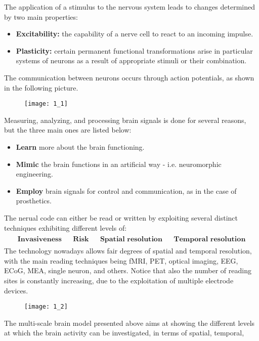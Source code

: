 The application of a stimulus to the nervous system leads to changes determined by
two main properties:
\begin{itemize}
    \item \textbf{Excitability:} the capability of a nerve cell to react to an
          incoming impulse.
    \item \textbf{Plasticity:} certain permanent functional transformations arise in
          particular systems of neurons as a result of appropriate stimuli or their
          combination.
\end{itemize}
The communication between neurons occurs through action potentials, as shown in the
following picture.
\begin{figure}[H]
    \texttt{[image: 1\_1]}
    \centering
\end{figure}
Measuring, analyzing, and processing brain signals is done for several reasons, but
the three main ones are listed below:
\begin{itemize}
    \item \textbf{Learn} more about the brain functioning.
    \item \textbf{Mimic} the brain functions in an artificial way - i.e. neuromorphic
          engineering.
    \item \textbf{Employ} brain signals for control and communication, as in the
          case of prosthetics.
\end{itemize}
The nerual code can either be read or written by exploiting several distinct
techniques exhibiting different levels of:
\begin{align*}
    \begin{matrix}
        \textbf{Invasiveness}       &  & \textbf{Risk}                &  &
        \textbf{Spatial resolution} &  & \textbf{Temporal resolution}
    \end{matrix}
\end{align*}
The technology nowadays allows fair degrees of spatial and temporal resolution, with
the main reading techniques being fMRI, PET, optical imaging, EEG, ECoG, MEA,
single neuron, and others. Notice that also the number of reading sites is constantly increasing, due to the
exploitation of multiple electrode devices.
\begin{figure}[H]
    \texttt{[image: 1\_2]}
    \centering
\end{figure}
The multi-scale brain model presented above aims at showing the different levels at
which the brain activity can be investigated, in terms of spatial, temporal,
